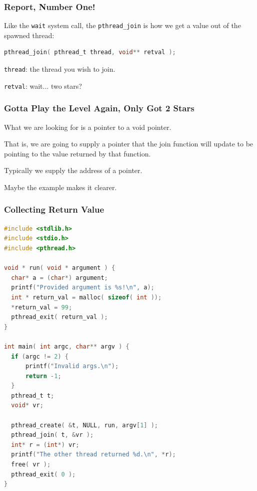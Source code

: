 \begin{frame}[fragile]
	\frametitle{Report, Number One!}

	Like the \texttt{wait} system call, the \texttt{pthread\_join} is how we get a value out of the spawned thread:

	\begin{lstlisting}[language=C]
pthread_join( pthread_t thread, void** retval );
\end{lstlisting}

	\texttt{thread}: the thread you wish to join.

	\texttt{retval}: wait... two stars?

\end{frame}

\begin{frame}
	\frametitle{Gotta Play the Level Again, Only Got 2 Stars}

	What we are looking for is a pointer to a void pointer.

	That is, we are going to supply a pointer that the join function will update to be pointing to the value returned by that function.

	Typically we supply the address of a pointer.

	Maybe the example makes it clearer.
\end{frame}


\begin{frame}[fragile]
	\frametitle{Collecting Return Value}

	\begin{lstlisting}[language=C]
#include <stdlib.h>
#include <stdio.h>
#include <pthread.h>

void * run( void * argument ) { 
  char* a = (char*) argument;
  printf("Provided argument is %s!\n", a); 
  int * return_val = malloc( sizeof( int )); 
  *return_val = 99; 
  pthread_exit( return_val );
}

int main( int argc, char** argv ) { 
  if (argc != 2) {
      printf("Invalid args.\n");
      return -1; 
  }
  pthread_t t;
  void* vr; 
  
  pthread_create( &t, NULL, run, argv[1] );
  pthread_join( t, &vr );
  int* r = (int*) vr; 
  printf("The other thread returned %d.\n", *r);
  free( vr );
  pthread_exit( 0 );
}
\end{lstlisting}


\end{frame}


